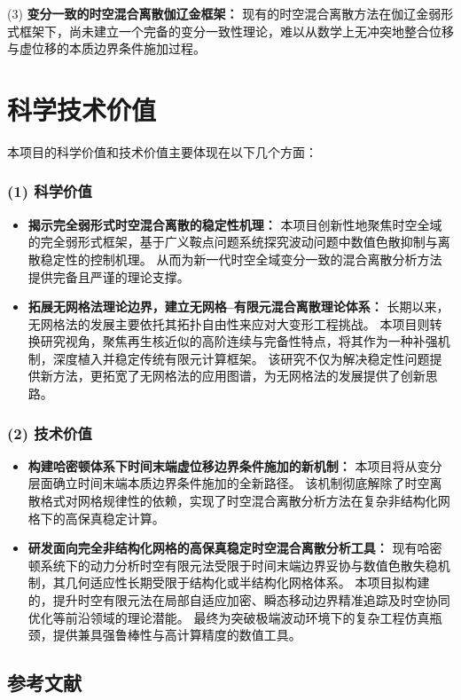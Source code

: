 (3) \textbf{变分一致的时空混合离散伽辽金框架：}
现有的时空混合离散方法在伽辽金弱形式框架下，尚未建立一个完备的变分一致性理论，难以从数学上无冲突地整合位移与虚位移的本质边界条件施加过程。

\section{\bfseries 科学技术价值}

本项目的科学价值和技术价值主要体现在以下几个方面：
\subsubsection*{\bfseries (1) 科学价值}

\begin{itemize}[left= 24pt]
	\item \textbf{揭示完全弱形式时空混合离散的稳定性机理：}
	本项目创新性地聚焦时空全域的完全弱形式框架，基于广义鞍点问题系统探究波动问题中数值色散抑制与离散稳定性的控制机理。
	从而为新一代时空全域变分一致的混合离散分析方法提供完备且严谨的理论支撑。

	\item \textbf{拓展无网格法理论边界，建立无网格--有限元混合离散理论体系：}
	长期以来，无网格法的发展主要依托其拓扑自由性来应对大变形工程挑战。
	本项目则转换研究视角，聚焦再生核近似的高阶连续与完备性特点，将其作为一种补强机制，深度植入并稳定传统有限元计算框架。
	该研究不仅为解决稳定性问题提供新方法，更拓宽了无网格法的应用图谱，为无网格法的发展提供了创新思路。
\end{itemize}

\subsubsection*{\bfseries (2) 技术价值}
\begin{itemize}[left= 24pt]
	\item \textbf{构建哈密顿体系下时间末端虚位移边界条件施加的新机制：}
	本项目将从变分层面确立时间末端本质边界条件施加的全新路径。
	该机制彻底解除了时空离散格式对网格规律性的依赖，实现了时空混合离散分析方法在复杂非结构化网格下的高保真稳定计算。

	\item \textbf{研发面向完全非结构化网格的高保真稳定时空混合离散分析工具：}
	现有哈密顿系统下的动力分析时空有限元法受限于时间末端边界妥协与数值色散失稳机制，其几何适应性长期受限于结构化或半结构化网格体系。
	本项目拟构建的\titlecn，提升时空有限元法在局部自适应加密、瞬态移动边界精准追踪及时空协同优化等前沿领域的理论潜能。
	最终为突破极端波动环境下的复杂工程仿真瓶颈，提供兼具强鲁棒性与高计算精度的数值工具。

\end{itemize}

\begin{REF}
\subsection*{\bfseries 参考文献}
\vspace{-50pt}
\end{REF}

\newpage%
